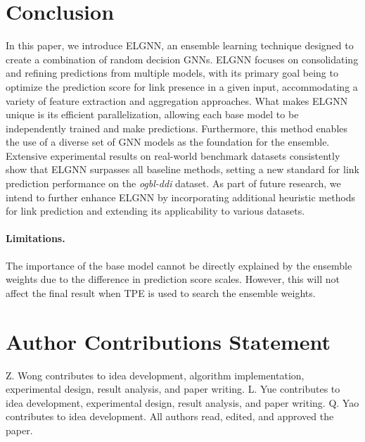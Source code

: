 \documentclass[11pt]{article}
\begin{document}
\section{Conclusion}
In this paper, we introduce ELGNN, an ensemble learning technique designed to create a combination of random decision GNNs. ELGNN focuses on consolidating and refining predictions from multiple models, with its primary goal being to optimize the prediction score for link presence in a given input, accommodating a variety of feature extraction and aggregation approaches. What makes ELGNN unique is its efficient parallelization, allowing each base model to be independently trained and make predictions. Furthermore, this method enables the use of a diverse set of GNN models as the foundation for the ensemble. Extensive experimental results on real-world benchmark datasets consistently show that ELGNN surpasses all baseline methods, setting a new standard for link prediction performance on the \textit{ogbl-ddi} dataset. As part of future research, we intend to further enhance ELGNN by incorporating additional heuristic methods for link prediction and extending its applicability to various datasets. 

\paragraph{Limitations.}
The importance of the base model cannot be directly explained by the ensemble weights due to the difference in prediction score scales. However, this will not affect the final result when TPE is used to search the ensemble weights.

 \section*{Author Contributions Statement}
Z. Wong contributes to idea development, algorithm implementation, experimental design, result analysis, and paper writing. L. Yue contributes to idea development, experimental design, result analysis, and paper writing. Q. Yao contributes to idea development. All authors read, edited, and approved the paper.
 

\clearpage


\end{document}
